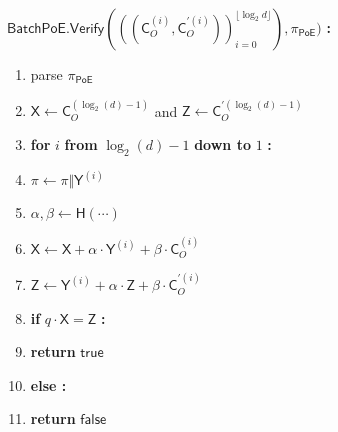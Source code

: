 \documentclass{article}
\theoremstyle{definition}
\begin{document}
\begin{mdframed}
$\mathsf{BatchPoE.Verify}(((\mathsf{C}_O^{(i)}, \mathsf{C}_O^{\prime(i)}))_{i=0}^{\lfloor \log_2 d \rfloor}), \pi_{\mathsf{PoE}})$ \textbf{:}
\begin{enumerate}[nolistsep]
	\item parse $\pi_{\mathsf{PoE}}$
	\item $\mathsf{X} \gets \mathsf{C}_O^{(\log_2(d)-1)}$ and $\mathsf{Z} \gets \mathsf{C}_O^{\prime(\log_2(d)-1)}$
	\item \textbf{for} $i$ \textbf{from} $\log_2(d) - 1$ \textbf{down to} $1$ \textbf{:}
	\item \pcind $\pi \gets \pi \Vert \mathsf{Y}^{(i)}$
	\item \pcind $\alpha, \beta \gets \mathsf{H}(\cdots)$
	\item \pcind $\mathsf{X} \gets \mathsf{X} + \alpha \cdot \mathsf{Y}^{(i)} + \beta \cdot \mathsf{C}_O^{(i)}$
	\item \pcind $\mathsf{Z} \gets \mathsf{Y}^{(i)} + \alpha \cdot \mathsf{Z} + \beta \cdot \mathsf{C}_O^{\prime(i)}$
	\item \textbf{if} $q \cdot \mathsf{X} = \mathsf{Z}$ \textbf{:}
	\item \pcind \textbf{return} $\mathsf{true}$
	\item \textbf{else :}
	\item \pcind \textbf{return} $\mathsf{false}$
\end{enumerate}
\end{mdframed}
\end{document}
